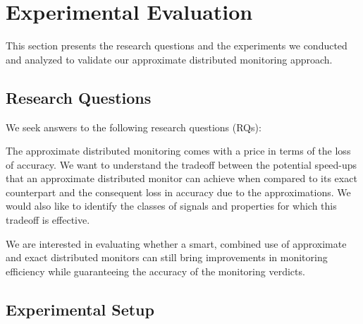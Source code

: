 \section{Experimental Evaluation} 
\label{sec:experiments}

This section presents the research questions and the experiments we conducted and analyzed to validate our approximate distributed monitoring approach.

\subsection{Research Questions}

We seek answers to the following research questions (RQs):

\begin{resq}
The  approximate distributed monitoring comes with a price in terms of the loss of accuracy.
We want to understand the tradeoff between the potential speed-ups that an approximate distributed monitor can achieve when compared to its exact counterpart and the consequent loss in accuracy due to the approximations.
We would also like to identify the classes of signals and properties for which this tradeoff is effective. 
\end{resq}

\begin{resq}
We are interested in evaluating whether a smart, combined use of approximate and exact distributed monitors can still bring improvements in monitoring efficiency while guaranteeing the accuracy of the monitoring verdicts. 
\end{resq}

\subsection{Experimental Setup}


